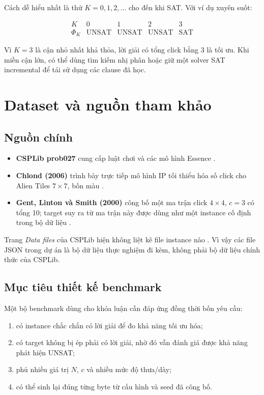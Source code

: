 \documentclass[11pt,a4paper]{article}
\begin{document}
Cách dễ hiểu nhất là thử $K=0,1,2,\ldots$ cho đến khi SAT. Với ví dụ xuyên
suốt:

\[
\begin{array}{c|cccc}
K&0&1&2&3\\
\hline
\Phi_K&\text{UNSAT}&\text{UNSAT}&\text{UNSAT}&\text{SAT}
\end{array}
\]

Vì $K=3$ là cận nhỏ nhất khả thỏa, lời giải có tổng click bằng 3 là tối ưu.
Khi miền cận lớn, có thể dùng tìm kiếm nhị phân hoặc giữ một solver SAT
incremental để tái sử dụng các clause đã học.

\section{Dataset và nguồn tham khảo}\label{sec:data}

\subsection{Nguồn chính}

\begin{itemize}
  \item \textbf{CSPLib prob027} cung cấp luật chơi và các mô hình Essence
        \cite{csplib027,csplib027models}.
  \item \textbf{Chlond (2006)} trình bày trực tiếp mô hình IP tối thiểu hóa
        số click cho Alien Tiles $7\times7$, bốn màu
        \cite{chlond2006alien}.
  \item \textbf{Gent, Linton và Smith (2000)} công bố một ma trận click
        $4\times4$, $c=3$ có tổng 10; target suy ra từ ma trận này được dùng
        như một instance cố định trong bộ dữ liệu
        \cite{gent2000symmetry,csplib027results}.
\end{itemize}

Trang \emph{Data files} của CSPLib hiện không liệt kê file instance nào
\cite{csplib027data}. Vì vậy các file JSON trong dự án là bộ dữ liệu thực
nghiệm đi kèm, không phải bộ dữ liệu chính thức của CSPLib.

\subsection{Mục tiêu thiết kế benchmark}

Một bộ benchmark dùng cho khóa luận cần đáp ứng đồng thời bốn yêu cầu:

\begin{enumerate}
  \item có instance chắc chắn có lời giải để đo khả năng tối ưu hóa;
  \item có target không bị ép phải có lời giải, nhờ đó vẫn đánh giá được
        khả năng phát hiện UNSAT;
  \item phủ nhiều giá trị $N$, $c$ và nhiều mức độ thưa/dày;
  \item có thể sinh lại đúng từng byte từ cấu hình và seed đã công bố.
\end{enumerate}
\end{document}
